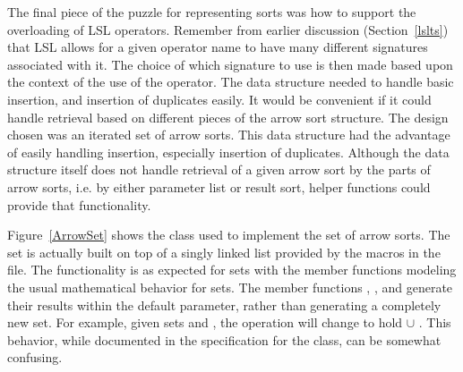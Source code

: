 The final piece of the puzzle for representing sorts was how to
support the overloading of LSL operators. Remember from earlier
discussion (Section~\ref{lslts}) that LSL allows for a given operator
name to have many different signatures associated with it. The choice
of which signature to use is then made based upon the context of the
use of the operator. The data structure needed to handle basic insertion,
and insertion of duplicates easily. It would be convenient if it could
handle retrieval based on different pieces of the arrow sort
structure. The design chosen was an iterated set of arrow sorts. This
data structure had the advantage of easily handling insertion,
especially insertion of duplicates. Although the data structure itself
does not handle retrieval of a given arrow sort by the parts of arrow
sorts, i.e. by either parameter list or result sort, helper functions
could provide that functionality.

Figure~\ref{ArrowSet} shows the class  used to
implement the set of arrow sorts. The set is actually built on top of
a singly linked list provided by the macros in the
 file. The functionality is as expected for
sets with the member functions modeling the usual mathematical
behavior for sets. The member functions ,
, and  generate their results
within the default parameter, rather than generating a completely new
set. For example, given sets  and , the
operation  will change  to hold
 $\cup$ . This behavior, while documented in
the specification for the class, can be somewhat confusing.

